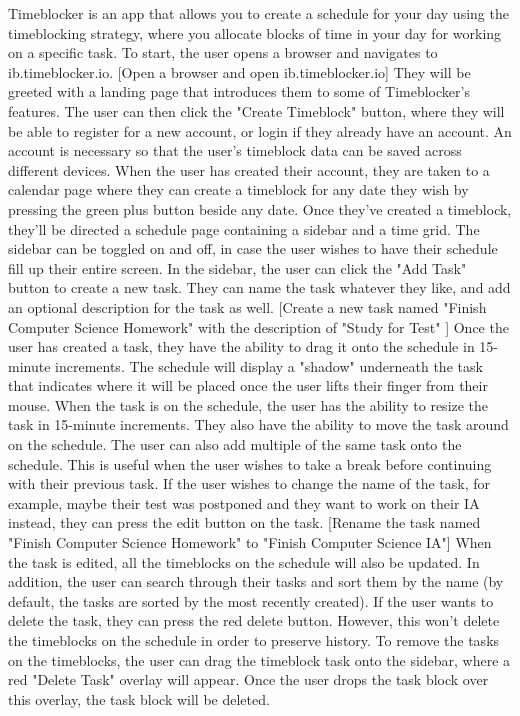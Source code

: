 \documentclass[notitlepage]{report}
\begin{document}
\obeylines
Timeblocker is an app that allows you to create a schedule for your day using the timeblocking strategy, where you allocate blocks of time in your day for working on a specific task.
To start, the user opens a browser and navigates to ib.timeblocker.io.
[Open a browser and open ib.timeblocker.io]
They will be greeted with a landing page that introduces them to some of Timeblocker's features.
The user can then click the "Create Timeblock" button, where they will be able to register for a new account, or login if they already have an account.
An account is necessary so that the user's timeblock data can be saved across different devices.
When the user has created their account, they are taken to a calendar page where they can create a timeblock for any date they wish by pressing the green plus button beside any date.
Once they've created a timeblock, they'll be directed a schedule page containing a sidebar and a time grid. The sidebar can be toggled on and off, in case the user wishes to have their schedule fill up their entire screen. In the sidebar, the user can click the "Add Task" button to create a new task. They can name the task whatever they like, and add an optional description for the task as well.
[Create a new task named "Finish Computer Science Homework" with the description of "Study for Test" ]
Once the user has created a task, they have the ability to drag it onto the schedule in 15-minute increments. The schedule will display a "shadow" underneath the task that indicates where it will be placed once the user lifts their finger from their mouse. When the task is on the schedule, the user has the ability to resize the task in 15-minute increments. They also have the ability to move the task around on the schedule.
The user can also add multiple of the same task onto the schedule. This is useful when the user wishes to take a break before continuing with their previous task.
If the user wishes to change the name of the task, for example, maybe their test was postponed and they want to work on their IA instead, they can press the edit button on the task.
[Rename the task named "Finish Computer Science Homework" to "Finish Computer Science IA"]
When the task is edited, all the timeblocks on the schedule will also be updated.
In addition, the user can search through their tasks and sort them by the name (by default, the tasks are sorted by the most recently created).
If the user wants to delete the task, they can press the red delete button. However, this won't delete the timeblocks on the schedule in order to preserve history. To remove the tasks on the timeblocks, the user can drag the timeblock task onto the sidebar, where a red "Delete Task" overlay will appear. Once the user drops the task block over this overlay, the task block will be deleted.
\end{document}
